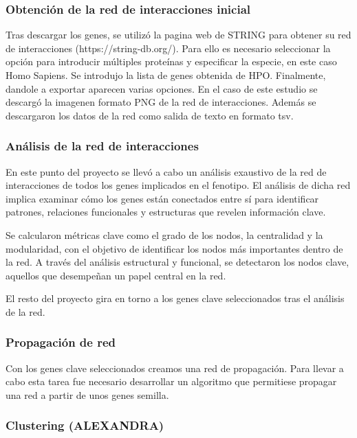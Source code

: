 \subsubsection{Obtención de la red de interacciones inicial}

Tras descargar los genes, se utilizó la pagina web de STRING para obtener su red de interacciones (https://string-db.org/). Para ello es necesario seleccionar la opción para introducir múltiples proteínas y especificar la especie, en este caso Homo Sapiens. Se introdujo la lista de genes obtenida de HPO. Finalmente, dandole a exportar aparecen varias opciones. En el caso de este estudio se descargó la imagenen formato PNG de la red de interacciones. Además se descargaron los datos de la red como salida de texto en formato tsv.


\subsubsection{Análisis de la red de interacciones}

En este punto del proyecto se llevó a cabo un análisis exaustivo de la red de interacciones de todos los genes implicados en el fenotipo. El análisis de dicha red  implica examinar cómo los genes están conectados entre sí para identificar patrones, relaciones funcionales y estructuras que revelen información clave. 

Se calcularon métricas clave como el grado de los nodos, la centralidad y la modularidad, con el objetivo de identificar los nodos más importantes dentro de la red. A través del análisis estructural y funcional, se detectaron los nodos clave, aquellos que desempeñan un papel central en la red.

El resto del proyecto gira en torno a los genes clave seleccionados tras el análisis de la red.

\subsubsection{Propagación de red}

Con los genes clave seleccionados creamos una red de propagación. Para llevar a cabo esta tarea fue necesario desarrollar un algoritmo que permitiese propagar una red a partir de unos genes semilla.


\subsubsection{Clustering (ALEXANDRA)}


